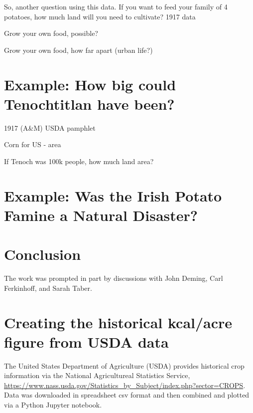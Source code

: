 \documentclass[12pt]{iopart}
\begin{document}
So, another question using this data.  If you want to feed your family of 4 potatoes, how much land will you need to cultivate?
1917 data

Grow your own food, possible?  

Grow your own food, how far apart (urban life?)


\section{Example: How big could Tenochtitlan have been?}

1917 (A\&M) USDA pamphlet

Corn for US - area

If Tenoch was 100k people, how much land area?

\section{Example: Was the Irish Potato Famine a Natural Disaster?}

\section{Conclusion}


\ack
The work was prompted in part by discussions with John Deming, Carl Ferkinhoff, and Sarah Taber.

\clearpage
\appendix
\section{Creating the historical kcal/acre figure from USDA data}
\label{how_yield_plot_is_made}
The United States Department of Agriculture (USDA) provides historical crop information via the National Agricultureal Statistics Service, \url{https://www.nass.usda.gov/Statistics_by_Subject/index.php?sector=CROPS}.  Data was downloaded in spreadsheet csv format and then combined and plotted via a Python Jupyter notebook.   
\end{document}
